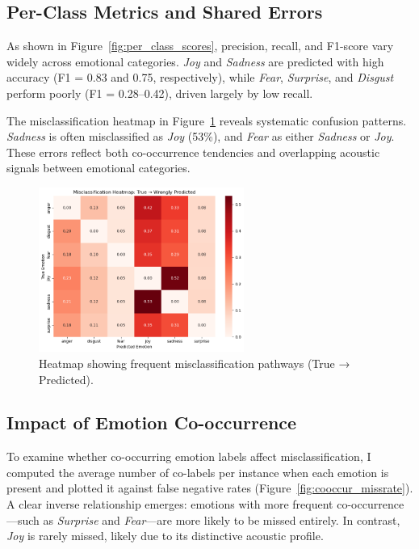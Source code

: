 \documentclass{article}
\begin{document}
\subsection{Per-Class Metrics and Shared Errors}

As shown in Figure~\ref{fig:per_class_scores}, precision, recall, and F1-score vary widely across emotional categories. \textit{Joy} and \textit{Sadness} are predicted with high accuracy (F1 = 0.83 and 0.75, respectively), while \textit{Fear}, \textit{Surprise}, and \textit{Disgust} perform poorly (F1 = 0.28–0.42), driven largely by low recall.

The misclassification heatmap in Figure~\ref{fig:confusion_heatmap} reveals systematic confusion patterns. \textit{Sadness} is often misclassified as \textit{Joy} (53\%), and \textit{Fear} as either \textit{Sadness} or \textit{Joy}. These errors reflect both co-occurrence tendencies and overlapping acoustic signals between emotional categories.

\begin{figure}[H]
\centering
\includegraphics[width=0.6\textwidth]{Graphics/Error Analysis/True to Wrongly Predicted.png}
\caption{Heatmap showing frequent misclassification pathways (True → Predicted).}
\label{fig:confusion_heatmap}
\end{figure}

\subsection{Impact of Emotion Co-occurrence}

To examine whether co-occurring emotion labels affect misclassification, I computed the average number of co-labels per instance when each emotion is present and plotted it against false negative rates (Figure~\ref{fig:cooccur_missrate}). A clear inverse relationship emerges: emotions with more frequent co-occurrence—such as \textit{Surprise} and \textit{Fear}—are more likely to be missed entirely. In contrast, \textit{Joy} is rarely missed, likely due to its distinctive acoustic profile.
\end{document}
